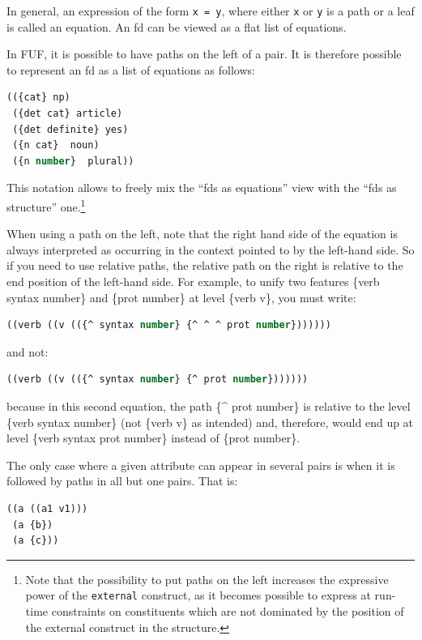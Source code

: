 \documentclass[10pt,a4paper]{report}
\begin{document}
In general, an expression of the form {\tt x = y}, where either {\tt x} or
{\tt y} is a path or a leaf is called an equation. 
An fd can be viewed as a flat list of equations.

In FUF, it is possible to have paths on the left of a pair.  It is
therefore possible to represent an fd as a list of equations as follows:

\begin{lstlisting}[language=Lisp]
(({cat} np)
 ({det cat} article)
 ({det definite} yes)
 ({n cat}  noun)
 ({n number}  plural))
\end{lstlisting}

This notation allows to freely mix the ``fds as equations'' view with the
``fds as structure'' one.\footnote{Note that the possibility to put paths on
the left increases the expressive power of the {\tt external} construct, as
it becomes possible to express at run-time constraints on constituents
which are not  dominated by the position of the external construct in the
structure.}

When using a path on the left, note that the right hand
side of the equation is always interpreted as occurring in the context
pointed to by the left-hand side.  So if you need to use relative paths,
the relative path on the right is relative to the end position of the
left-hand side.  For example, to unify two features \{verb syntax number\}
and \{prot number\} at level \{verb v\}, you must write:

\begin{lstlisting}[language=Lisp]
((verb ((v (({^ syntax number} {^ ^ ^ prot number}))))))
\end{lstlisting}

and not:

\begin{lstlisting}[language=Lisp]
((verb ((v (({^ syntax number} {^ prot number}))))))
\end{lstlisting}

because in this second equation, the path \{\^{} prot number\} is relative to
the level \{verb syntax number\} (not \{verb v\} as intended) and, therefore,
would end up at level \{verb syntax prot number\} instead of \{prot number\}.

The only case where a given attribute can appear in several pairs is when
it is followed by paths in all but one pairs. That is:

\begin{lstlisting}[language=Lisp]
((a ((a1 v1)))
 (a {b})
 (a {c}))
\end{lstlisting}
\end{document}
